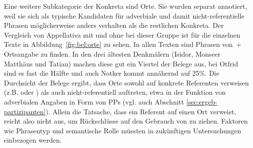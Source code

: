 Eine weitere Subkategorie der Konkreta sind Orte. Sie wurden separat annotiert, weil sie sich als typische Kandidaten für adverbiale und damit nicht-referentielle Phrasen möglicherweise anders verhalten als die restlichen Konkreta. Der Vergleich von Appellativa mit und ohne  bei dieser Gruppe ist für die einzelnen Texte in Abbildung~\ref{fig:bel:orte} zu sehen. In allen Texten sind Phrasen von \,+\,Ortsangabe zu finden. In den drei ältesten Denkmälern (Isidor, Monseer Matthäus und Tatian) machen diese gut ein Viertel der Belege aus, bei Otfrid sind es fast die Hälfte und auch Notker kommt annähernd auf 25\%. Die Durchsicht der Belege ergibt, dass Orte sowohl auf konkrete Referenten verweisen (z.B.  oder ) als auch nicht-referentiell auftreten, etwa in der Funktion von adverbialen Angaben in Form von PPs (vgl. auch Abschnitt \ref{sec:ergeb-partizipanten}).
Allein die Tatsache, dass ein Referent auf einen Ort verweist, reicht also nicht aus, um Rückschlüsse auf den Gebrauch von  zu ziehen. Faktoren wie Phrasentyp und semantische Rolle müssten in zukünftigen Untersuchungen einbezogen werden.  


